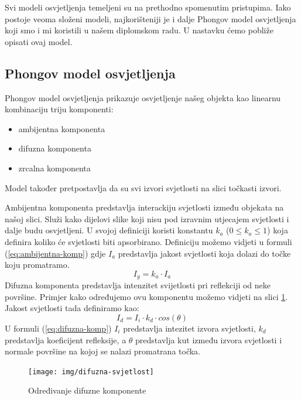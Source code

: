 \documentclass[times, utf8, diplomskirad]{fer}
\begin{document}
Svi modeli osvjetljenja temeljeni su na prethodno spomenutim pristupima.
Iako postoje veoma složeni modeli, najkorišteniji je i dalje Phongov model osvjetljenja koji smo i mi koristili u našem diplomskom radu.
U nastavku ćemo pobliže opisati ovaj model.

\subsection{Phongov model osvjetljenja}
Phongov model osvjetljenja prikazuje osvjetljenje našeg objekta kao linearnu kombinaciju triju komponenti:
\begin{itemize}
    \item ambijentna komponenta
    \item difuzna komponenta
    \item zrcalna komponenta
\end{itemize}
Model također pretpostavlja da su svi izvori svjetlosti na slici točkasti izvori.

Ambijentna komponenta predstavlja interackiju svjetlosti između objekata na našoj slici.
Služi kako dijelovi slike koji nisu pod izravnim utjecajem svjetlosti i dalje budu osvjetljeni.
U svojoj definiciji koristi konstantu $k_a$ ($0 \leq k_a \leq 1$) koja definira koliko će svjetlosti biti apsorbirano.
Definiciju možemo vidjeti u formuli (\ref{eq:ambijentna-komp}) gdje $I_a$ predstavlja jakost svjetlosti koja dolazi do točke koju promatramo.
\begin{equation}
    I_g = k_a \cdot I_a
    \label{eq:ambijentna-komp}
\end{equation}
Difuzna komponenta predstavlja intenzitet svijetlosti pri reflekciji od neke površine.
Primjer kako određujemo ovu komponentu možemo vidjeti na slici \ref{fig:difuzna-svjetlost}.
Jakost svjetlosti tada definiramo kao:
\begin{equation}
    I_d = I_i \cdot k_d \cdot cos(\theta)
    \label{eq:difuzna-komp}
\end{equation}
U formuli (\ref{eq:difuzna-komp}) $I_i$ predstavlja intezitet izvora svjetlosti, $k_d$ predstavlja koeficijent refleksije, a $\theta$ predstavlja kut između izvora svjetlosti i normale površine na kojoj se nalazi promatrana točka.

\begin{figure}[H]
    \centering
    \texttt{[image: img/difuzna-svjetlost]}
    \caption{Određivanje difuzne komponente}
    \label{fig:difuzna-svjetlost}
\end{figure}
\end{document}
